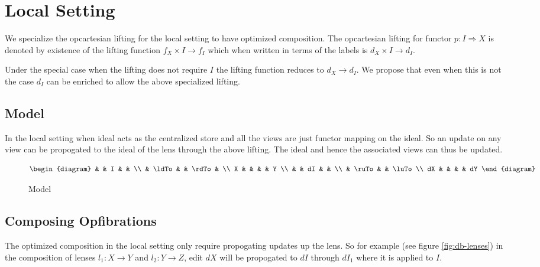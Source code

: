 \documentclass[a4paper,10pt]{article}
\begin{document}
\section{Local Setting}
We specialize the opcartesian lifting for the local setting to have
optimized composition. The opcartesian lifting for functor $p: I
\Rightarrow X$ is denoted by existence of the lifting function $f_X
\times I \to f_I$ which when written in terms of the labels is $d_X
\times I \to d_I$. 

Under the special case when the lifting does not require $I$ the
lifting function reduces to $d_X \to d_I$. We propose that even when
this is not the case $d_I$ can be enriched to allow the above
specialized lifting.

\subsection{Model}
In the local setting when ideal acts as the centralized store and all
the views are just functor mapping on the ideal. So an update on any
view can be propogated to the ideal of the lens through the above
lifting. The ideal and hence the associated views can thus be updated.

\begin{figure}[ht]
\begin{displaymath}
\begin{diagram}
  &       & I &   &  \\
  & \ldTo & & \rdTo & \\
X & & & & Y      \\
  &       & dI  & & \\
  & \ruTo & & \luTo \\
dX & & & & dY
\end{diagram}
\end{displaymath}
\caption{Model}
\label{fig:db-lens}
\end{figure}  

\subsection{Composing Opfibrations}
The optimized composition in the local setting only require
propogating updates up the lens. So for example (see figure
\ref{fig:db-lenses}) in the composition of lenses $l_1: X \to Y$ and
$l_2: Y \to Z$, edit $dX$ will be propogated to $dI$ through $dI_1$
where it is applied to $I$. 
\end{document}
